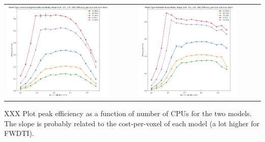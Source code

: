 \documentclass[
  letterpaper,
  DIV=11,
  numbers=noendperiod]{scrartcl}
\begin{document}
\begin{longtable}[]{@{}
  >{\raggedright\arraybackslash}p{}
  >{\raggedright\arraybackslash}p{}@{}}
\toprule\noalign{}
\endhead
\bottomrule\noalign{}
\endlastfoot
\includegraphics[width=0.8\textwidth,height=0.8\textheight]{figures/csdm_efficency.png}
&
\includegraphics[width=0.8\textwidth,height=0.8\textheight]{figures/fwdtim_efficency.png} \\
\end{longtable}

XXX Plot peak efficiency as a function of number of CPUs for the two
models. The slope is probably related to the cost-per-voxel of each
model (a lot higher for FWDTI).
\end{document}
